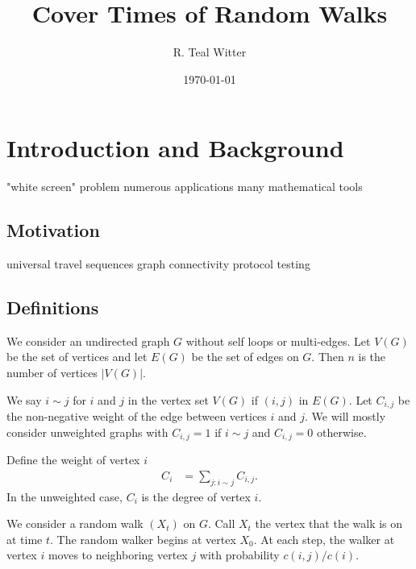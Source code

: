 \documentclass[12pt]{article}
\theoremstyle{definition}
\begin{document}
\title{Cover Times of Random Walks}


\author{R. Teal Witter}

\date{\today}



\maketitle


\newpage
\tableofcontents

\newpage
\section{Introduction and Background}

"white screen" problem
numerous applications
many mathematical tools

\subsection{Motivation}
universal travel sequences
graph connectivity
protocol testing

\subsection{Definitions}
We consider an undirected graph $G$ without self loops or multi-edges.
Let $V(G)$ be the set of vertices and let $E(G)$ be the set of edges on $G$.
Then $n$ is the number of vertices $|V(G)|$.

We say $i\sim j$ for $i$ and $j$ in the vertex set $V(G)$ if $(i,j)$ in $E(G)$.
Let $C_{i,j}$ be the non-negative weight of the edge between vertices $i$ and $j$.
We will mostly consider unweighted graphs
with $C_{i,j} = 1$ if $i \sim j$ and $C_{i,j} = 0$ otherwise.

Define the weight of vertex $i$ 
\begin{align}
C_i &= \sum_{j:i \sim j} C_{i,j}. \nonumber
\end{align}
In the unweighted case, $C_i$ is the degree of vertex $i$.

We consider a random walk $(X_t)$ on $G$.
Call $X_t$ the vertex that the walk is on at time $t$.
The random walker begins at vertex $X_0$.
At each step, the walker at vertex $i$ moves to neighboring vertex
$j$ with probability $c(i,j)/c(i)$.
\end{document}
